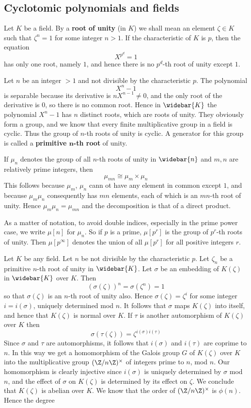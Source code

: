 \subsection{Cyclotomic polynomials and fields}
Let $K$ be a field. By a \textbf{root of unity} (in $K$) we shall mean an element $\zeta\in K$ such that $\zeta^n=1$ for some integer $n>1$. If the characteristic of $K$ is $p$, then the equation
\[X^{p^d}=1\]
has only one root, namely $1$, and hence there is no $p^d$-th root of unity except $1$.\par
Let $n$ be an integer $>1$ and not divisible by the characteristic $p$. The polynomial
\[X^n-1\]
is separable because its derivative is $nX^{n-1}\neq 0$, and the only root of the derivative is $0$, so there is no common root. Hence in $\widebar{K}$ the polynomial $X^n-1$ has $n$ distinct roots, which are roots of unity. They obviously form a group, and we know that every finite multiplicative group in a field is cyclic. Thus the group of $n$-th roots of unity is cyclic. A generator for this group is called a \textbf{primitive $\bm{n}$-th root} of unity.\par
If $\mu_n$ denotes the group of all $n$-th roots of unity in $\widebar{n}$ and $m,n$ are relatively prime integers, then
\[\mu_{mn}\cong\mu_m\times\mu_n\]
This follows because $\mu_m$, $\mu_n$ cann ot have any element in common except $1$, and because $\mu_m\mu_n$ consequently has $mn$ elements, each of which is an $mn$-th root of unity. Hence $\mu_m\mu_n=\mu_{mn}$ and the decomposition is that of a direct product.\par
As a matter of notation, to avoid double indices, especially in the prime power case, we write $\mu[n]$ for $\mu_n$. So if $p$ is a prime, $\mu[p^r]$ is the group of $p^r$-th roots of unity. Then $\mu[p^{\infty}]$ denotes the union of all $\mu[p^r]$ for all positive integers $r$.\par
Let $K$ be any field. Let $n$ be not divisible by the characteristic $p$. Let $\zeta_n$ be a primitive $n$-th root of unity in $\widebar{K}$. Let $\sigma$ be an embedding of $K(\zeta)$ in $\widebar{K}$ over $K$. Then
\[(\sigma(\zeta))^n=\sigma(\zeta^n)=1\]
so that $\sigma(\zeta)$ is an $n$-th root of unity also. Hence $\sigma(\zeta)=\zeta^i$ for some integer $i=i(\sigma)$, uniquely determined mod $n$. It follows that $\sigma$ maps $K(\zeta)$ into itself, and hence that $K(\zeta)$ is normal over $K$. If $\tau$ is another automorphism of $K(\zeta)$ over $K$ then
\[\sigma(\tau(\zeta))=\zeta^{i(\sigma)i(\tau)}\]
Since $\sigma$ and $\tau$ are automorphisms, it follows that $i(\sigma)$ and $i(\tau)$ are coprime to $n$. In this way we get a homomorphism of the Galois group $G$ of $K(\zeta)$ over $K$ into the multiplicative group $(\Z/n\Z)^\times$ of integers prime to $n$, mod $n$. Our homomorphism is clearly injective since $i(\sigma)$ is uniquely determined by $\sigma$ mod $n$, and the effect of $\sigma$ on $K(\zeta)$ is determined by its effect on $\zeta$. We conclude that $K(\zeta)$ is abelian over $K$. We know that the order of $(\Z/n\Z)^\times$ is $\phi(n)$. Hence the degree
